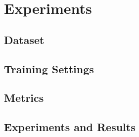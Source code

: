 \documentclass[letterpaper,12pt]{article}
\begin{document}

\section{Experiments}

\subsection{Dataset}

\subsection{Training Settings}

\subsection{Metrics}

\subsection{Experiments and Results}


\end{document}
